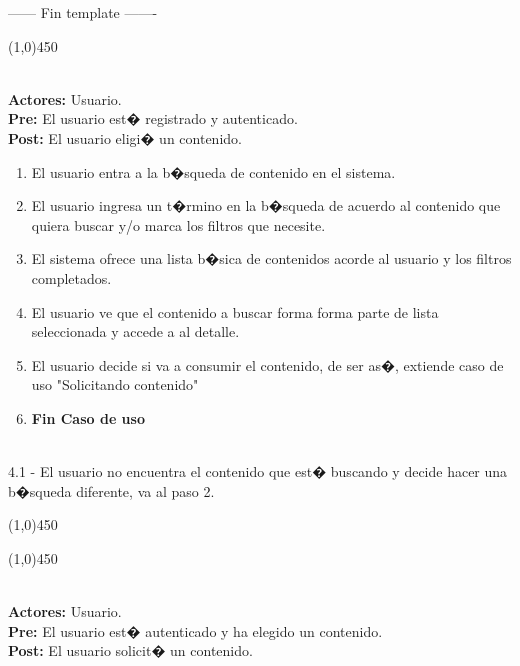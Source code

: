 \documentclass[11pt, a4paper, spanish]{article}
\begin{document}
------ Fin template -------\\
 
\newpage

\begin{center} \line(1,0){450} \end{center}
 \\
\textbf{Actores:} Usuario. \\
\textbf{Pre:} El usuario est� registrado y autenticado. \\
\textbf{Post:} El usuario eligi� un contenido.\\


\begin{enumerate}
	\item El usuario entra a la b�squeda de contenido en el sistema.
	\item El usuario ingresa un t�rmino en la b�squeda de acuerdo al contenido que quiera buscar y/o marca los filtros que necesite.
	\item El sistema ofrece una lista b�sica de contenidos acorde al usuario y los filtros completados.
	\item El usuario ve que el contenido a buscar forma forma parte de lista seleccionada y accede a al detalle.
	\item El usuario decide si va a consumir el contenido, de ser as�, extiende caso de uso "Solicitando contenido"
	\item \textbf{Fin Caso de uso}
\end{enumerate}

 \\

4.1 - El usuario no encuentra el contenido que est� buscando y decide
hacer una b�squeda diferente, va al paso 2.

\begin{center} \line(1,0){450} \end{center}

\newpage

\begin{center} \line(1,0){450} \end{center}

 \\
\textbf{Actores:} Usuario. \\
\textbf{Pre:} El usuario est� autenticado y ha elegido un contenido. \\
\textbf{Post:} El usuario solicit� un contenido.\\
\end{document}
